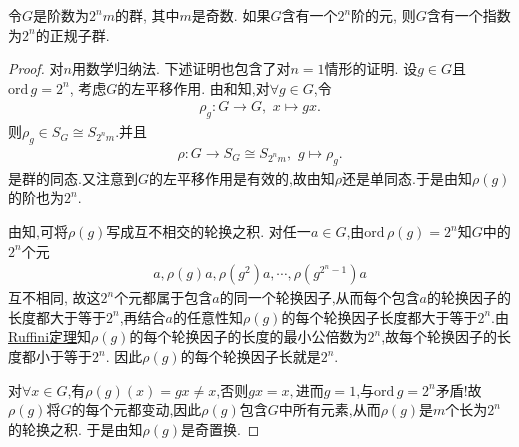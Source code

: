 \documentclass[../../main.tex]{subfiles}%
\begin{document}
\begin{example}
令$G$是阶数为$2^n m$的群, 其中$m$是奇数. 如果$G$含有一个$2^n$阶的元, 则$G$含有一个指数为$2^n$的正规子群.
\end{example}
\begin{proof}

对$n$用数学归纳法. 下述证明也包含了对$n=1$情形的证明. 设$g \in G$且$\text{ord}\,g=2^n$, 考虑$G$的左平移作用. 由和知,对$\forall g\in G$,令
\begin{align*}
\rho_g: G\to G,\,\,x\mapsto gx.
\end{align*}
则$\rho_g\in S_G\cong S_{2^nm}$.并且
\begin{align*}
\rho: G \to S_G\cong S_{2^n m},\,\,g\mapsto \rho_g.
\end{align*}
是群的同态.又注意到$G$的左平移作用是有效的,故由知$\rho$还是单同态.于是由知$\rho(g)$的阶也为$2^n$.

由知,可将$\rho(g)$写成互不相交的轮换之积. 对任一$a \in G$,由$\text{ord}\,\rho(g)=2^n$知$G$中的$2^n$个元
\begin{align*}
a, \rho(g)a, \rho(g^2)a, \cdots, \rho(g^{2^n-1})a
\end{align*}
互不相同, 故这$2^n$个元都属于包含$a$的同一个轮换因子,从而每个包含$a$的轮换因子的长度都大于等于$2^n$,再结合$a$的任意性知$\rho(g)$的每个轮换因子长度都大于等于$2^n$.由\hyperref[theorem:抽象代数--Ruffini(鲁菲尼)定理]{Ruffini定理}知$\rho(g)$的每个轮换因子的长度的最小公倍数为$2^n$,故每个轮换因子的长度都小于等于$2^n$.
因此$\rho(g)$的每个轮换因子长就是$2^n$. 

对$\forall x\in G$,有$\rho(g)(x)=gx\neq x$,否则$gx=x,$进而$g=1$,与$\text{ord}\,g=2^n$矛盾!故$\rho(g)$将$G$的每个元都变动,因此$\rho(g)$包含$G$中所有元素,从而$\rho(g)$是$m$个长为$2^n$的轮换之积. 于是由知$\rho(g)$是奇置换.


\end{proof}
\end{document}
